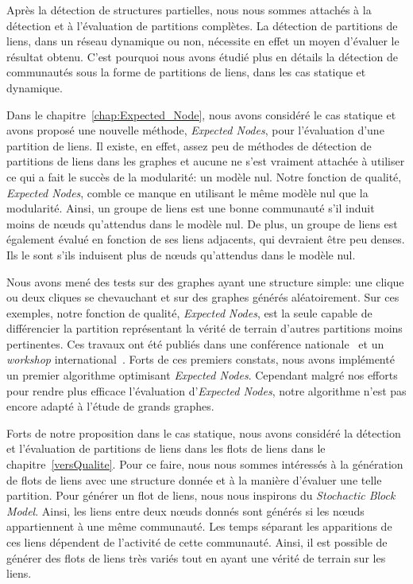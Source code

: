 Après la détection de structures partielles, nous nous sommes attachés à la détection et à l'évaluation de partitions complètes.
La détection de partitions de liens, dans un réseau dynamique ou non, nécessite en effet un moyen d'évaluer le résultat obtenu.
C'est pourquoi nous avons étudié plus en détails la détection de communautés sous la forme de partitions de liens, dans les cas statique et dynamique.


Dans le chapitre~\ref{chap:Expected_Node},  nous avons considéré le cas statique et avons proposé une nouvelle méthode, \emph{Expected Nodes}, pour l'évaluation d'une partition de liens.
Il existe, en effet, assez peu de méthodes de détection de partitions de liens dans les graphes et aucune ne s'est vraiment attachée à utiliser ce qui a fait le succès de la modularité: un modèle nul.
Notre fonction de qualité, \emph{Expected Nodes}, comble ce manque en utilisant le même modèle nul que la modularité.
Ainsi, un groupe de liens est une bonne communauté s'il induit moins de n\oe{}uds qu'attendus dans le modèle nul.
De plus, un groupe de liens est également évalué en fonction de ses liens adjacents, qui devraient être peu denses.
Ils le sont s'ils induisent plus de n\oe{}uds qu'attendus dans le modèle nul.

Nous avons mené des tests sur des graphes ayant une structure simple: une clique ou deux cliques se chevauchant et sur des graphes générés aléatoirement.
Sur ces exemples, notre fonction de qualité, \emph{Expected} \emph{Nodes}, est la seule capable de différencier la partition représentant la vérité de terrain d'autres partitions moins pertinentes.
Ces travaux ont été publiés dans une conférence nationale~\cite{Gaumont2014} et un \emph{workshop} international~\cite{Gaumont2015}.
Forts de ces premiers constats, nous avons implémenté un premier algorithme optimisant \emph{Expected Nodes}.
Cependant malgré nos efforts pour rendre plus efficace l'évaluation d'\emph{Expected Nodes}, notre algorithme n'est pas encore adapté à l'étude de grands graphes.

\bigskip

Forts de notre proposition dans le cas statique, nous avons considéré la détection et l'évaluation de partitions de liens dans les flots de liens dans le chapitre~\ref{versQualite}.
Pour ce faire, nous nous sommes intéressés à la génération de flots de liens avec une structure donnée et à la manière d'évaluer une telle partition.
Pour générer un flot de liens, nous nous inspirons du \emph{Stochactic Block Model}.
Ainsi, les liens entre deux n\oe{}uds donnés sont générés  si les n\oe{}uds appartiennent à une même communauté.
Les temps séparant les apparitions de ces liens dépendent de l'activité de cette communauté.
Ainsi, il est possible de générer des flots de liens très variés tout en ayant une vérité de terrain sur les liens.

